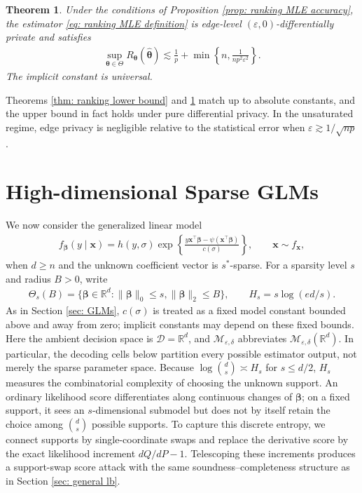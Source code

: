 \documentclass[letterpaper,12pt]{article}
\numberwithin{equation}{section}
\theoremstyle{plain}
\newtheorem{Theorem}{Theorem}
\numberwithin{Theorem}{section}
\numberwithin{proposition}{section}
\numberwithin{Lemma}{section}
{
	\theoremstyle{definition}
	\newtheorem{Definition}{Definition}
	\newtheorem{example}{Example}
	\numberwithin{example}{section}
	\newtheorem{fact}{Fact}
	\numberwithin{fact}{section}
	\newtheorem{remark}{Remark}
}
\newcommand{\furtherrev}[1]{#1}
\newcommand{\1}{\mathbbm{1}}
\def\bbeta{{\boldsymbol{\beta}}}
\def\bth{{\boldsymbol{\theta}}}
\begin{document}
{\begin{Theorem}\label{thm: ranking upper bound}
Under the conditions of Proposition \ref{prop: ranking MLE accuracy}, the estimator \eqref{eq: ranking MLE definition} is edge-level $(\varepsilon,0)$-differentially private and satisfies
\begin{align}\label{eq: ranking upper bound}
\sup_{\bth\in\Theta}R_\bth(\hat\bth)
\lesssim \frac1p+\min\left\{n,\frac{1}{np^2\varepsilon^2}\right\}.
\end{align}
\furtherrev{The implicit constant is universal.}
\end{Theorem}

Theorems \ref{thm: ranking lower bound} and \ref{thm: ranking upper bound} match up to absolute constants, and the upper bound in fact holds under pure differential privacy. In the unsaturated regime, edge privacy is negligible relative to the statistical error when $\varepsilon\gtrsim1/\sqrt{np}$.
}


\begingroup


\section{High-dimensional Sparse GLMs}\label{sec: sparse GLMs}

We now consider the generalized linear model
\begin{align}
	f_{\bbeta}(y\mid\bm x)
	=h(y,\sigma)\exp\left\{\frac{y\bm x^\top\bbeta-
	\psi(\bm x^\top\bbeta)}{c(\sigma)}\right\},
	\qquad \bm x\sim f_{\bm x},                              \label{eq: sparse glm definition}
\end{align}
when $d\geq n$ and the unknown coefficient vector is $s^*$-sparse.  For a sparsity level $s$ and radius $B>0$, write
\begin{align*}
	\Theta_s(B)=\{\bbeta\in\mathbb R^d:\|\bbeta\|_0\leq s,
	\|\bbeta\|_2\leq B\},
	\qquad H_s=s\log(ed/s).
\end{align*}
As in Section \ref{sec: GLMs}, $c(\sigma)$ is treated as a fixed model constant bounded above and away from zero; implicit constants may depend on these fixed bounds.
\furtherrev{Here the ambient decision space is $\mathcal D=\mathbb R^d$, and $\mathcal M_{\varepsilon,\delta}$ abbreviates $\mathcal M_{\varepsilon,\delta}(\mathbb R^d)$. In particular, the decoding cells below partition every possible estimator output, not merely the sparse parameter space.}
Because $\log\binom ds\asymp H_s$ for $s\leq d/2$, $H_s$ measures the combinatorial complexity of choosing the unknown support.  An ordinary likelihood score differentiates along continuous changes of $\bbeta$; on a fixed support, it sees an $s$-dimensional submodel but does not by itself retain the choice among $\binom ds$ possible supports.  To capture this discrete entropy, we connect supports by single-coordinate swaps and replace the derivative score by the exact likelihood increment $dQ/dP-1$.  Telescoping these increments produces a support-swap score attack with the same soundness--completeness structure as in Section \ref{sec: general lb}.
\end{document}

